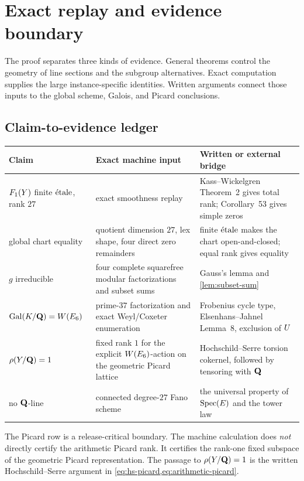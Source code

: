 \section{Exact replay and evidence boundary}
\label{sec:exact-replay}

The proof separates three kinds of evidence.  General theorems control the
geometry of line sections and the subgroup alternatives.  Exact computation
supplies the large instance-specific identities.  Written arguments connect
those inputs to the global scheme, Galois, and Picard conclusions.

\subsection{Claim-to-evidence ledger}

\begin{center}
\small
\begin{tabular}{@{}>{\raggedright\arraybackslash}p{}>{\raggedright\arraybackslash}p{}>{\raggedright\arraybackslash}p{}@{}}
\toprule
Claim & Exact machine input & Written or external bridge\\
\midrule
\(F_1(Y)\) finite \(\mathrm{\acute{e}tale}\), rank \(27\)
& exact smoothness replay
& Kass--Wickelgren Theorem~2 gives total rank; Corollary~53 gives simple
zeros\\
global chart equality
& quotient dimension \(27\), lex shape, four direct zero remainders
& finite \(\mathrm{\acute{e}tale}\) makes the chart open-and-closed; equal rank gives equality\\
\(g\) irreducible
& four complete squarefree modular factorizations and subset sums
& Gauss's lemma and \cref{lem:subset-sum}\\
\(\operatorname{Gal}(K/\mathbf Q)=W(E_6)\)
& prime-\(37\) factorization and exact Weyl/Coxeter enumeration
& Frobenius cycle type, Elsenhans--Jahnel Lemma~8, exclusion of \(U\)\\
\(\rho(Y/\mathbf Q)=1\)
& fixed rank \(1\) for the explicit \(W(E_6)\)-action on the geometric Picard
lattice
& Hochschild--Serre torsion cokernel, followed by tensoring with \(\mathbf Q\)\\
no \(\mathbf Q\)-line
& connected degree-\(27\) Fano scheme
& the universal property of \(\operatorname{Spec}(E)\) and the tower law\\
\bottomrule
\end{tabular}
\end{center}

The Picard row is a release-critical boundary.  The machine calculation does
\emph{not} directly certify the arithmetic Picard rank.  It certifies the
rank-one fixed subspace of the geometric Picard representation.  The passage
to \(\rho(Y/\mathbf Q)=1\) is the written Hochschild--Serre argument in
\cref{eq:hs-picard,eq:arithmetic-picard}.

